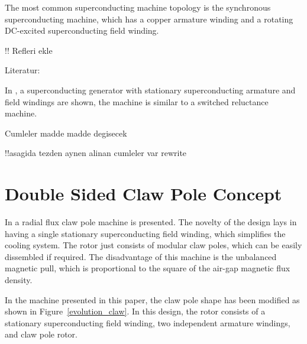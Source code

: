 \documentclass[12pt]{iopart}
\begin{document}
The most common superconducting machine topology is the synchronous superconducting machine, which has a copper armature winding and a rotating DC-excited superconducting field winding.  

!! Refleri ekle



Literatur:

In \cite{Chen2014}, a superconducting generator with stationary superconducting armature and field windings are shown, the machine is similar to a switched reluctance machine.

Cumleler madde madde degisecek

!!asagida tezden aynen alinan cumleler var rewrite

\section{Double Sided Claw Pole Concept}

In \cite{} a radial flux claw pole machine is presented. The novelty of the design lays in having a single stationary superconducting field winding, which simplifies the cooling system. The rotor just consists of modular claw poles, which can be easily dissembled if required. The disadvantage of this machine is the unbalanced magnetic pull, which is proportional to the square of the air-gap magnetic flux density.

In the machine presented in this paper, the claw pole shape has been modified as shown in Figure~\ref{evolution_claw}. In this design, the rotor consists of a stationary superconducting field winding, two independent armature windings, and claw pole rotor.
\end{document}
